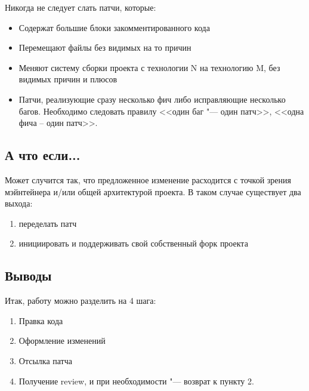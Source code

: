 \documentclass[10pt, a5paper]{article}
\begin{document}
Никогда не следует слать патчи, которые:

\begin{itemize}
    \item     Содержат большие блоки закомментированного кода
    \item Перемещают файлы без видимых на то причин
    \item Меняют систему сборки проекта с технологии N на технологию M, без видимых причин и плюсов
    \item Патчи, реализующие сразу несколько фич либо исправляющие несколько багов. Необходимо следовать правилу <<один баг "--- один патч>>, <<одна фича – один патч>>.
\end{itemize}

\subsection*{А что если...}

Может случится так, что предложенное изменение расходится с точкой зрения мэйнтейнера и/или общей архитектурой проекта. В таком случае существует два выхода:

\begin{enumerate}
\item    переделать патч
\item    инициировать и поддерживать свой собственный форк проекта
\end{enumerate}

\subsection*{Выводы}

Итак, работу можно разделить на 4 шага:

\begin{enumerate}
\item    Правка кода
\item Оформление изменений
\item Отсылка патча
\item Получение review, и при необходимости "--- возврат к пункту 2.
\end{enumerate}
\end{document}

